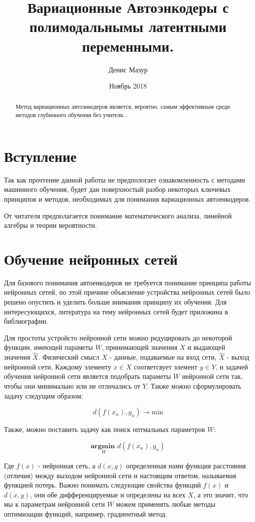 \documentclass{article}
\title{Вариационные Автоэнкодеры с полимодальнымы латентными переменными.}
\author{Денис Мазур}
\date{Ноябрь 2018}
\begin{document}
\maketitle

\begin{abstract}
    Метод вариационных автоэнкодеров является, вероятно, самым эффективным
    среди методов глубинного обучения без учителя...
\end{abstract}

\tableofcontents

\section{Вступление}
Так как прочтение данной работы не предпологает ознакомленность с методами машинного обучения, будет дан поверхностый разбор некоторых ключевых принципов и методов,
необходимых для понимания вариационных автоенкодеров. 

От читателя предполагается понимание математического анализа, линейной алгебры и теории вероятности.

\section{Обучение нейронных сетей}
Для базового понимания автоенкодеров не требуется понимание принципа работы нейронных сетей, по этой причине объяснение устройства нейронных сетей было решено опустить 
и уделить больше внимания принципу их обучения. Для интересующихся, литература на тему нейронных сетей будет приложина в библиографии.

Для простоты устройсто нейронной сети можно редуцировать до некоторой функции, имеющей параметы $W$, принимающей значения $X$ и выдающей значения $\widehat{X}$. 
Физический смысл $X$ - данные, подаваемые на вход сети, $\widehat{X}$ - выход нейронной сети. Каждому элементу $x \in X$ соответсвует элемент $y \in Y$, и задачей обучения
нейронной сети является подобрать параметы $W$ нейронной сети так, чтобы они минимально или не отличались от $Y$. Также можно сформулировать задачу следущим образом:

$$d(f(x_n), y_n) \rightarrow \text{min}$$

Также, можно поставить задачу как поиск оптмальных параметров $W$:

$$\underset{W}{\textbf{argmin }} d(f(x_n), y_n)$$ 

Где $f(x)$ - нейронная сеть, а $d(x, y)$ определенная нами функция расстояния (отличия) между выходом нейронной сети и настоящим ответом, называемая функцией потерь.
Важно понимать следующие свойства функций $f(x)$ и $d(x, y)$, они обе дифференцируемые и определены на всех $X$, а это значит, что мы к параметрам нейронной сети $W$ можем
применять любые методы оптимизации функций, например, градиентный метод.
\end{document}
